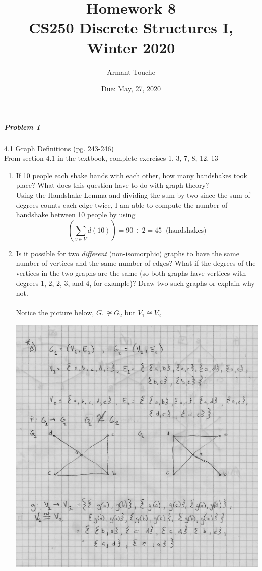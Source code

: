 \documentclass[11pt,a4paper]{article}
\title{\bf Homework 8\\[1ex]
\rm\normalsize CS250 Discrete Structures I, Winter 2020 }
\date{\normalsize Due: May, 27, 2020}
\author{\normalsize Armant Touche}
\newcommand\setItemNumber[1]{\setcounter{enumi}{\numexpr#1-1\relax}}
\begin{document}
 
\vspace{0cm}\maketitle 
	
	
	\subparagraph{Problem 1} 4.1 Graph Definitions (pg. 243-246) \\
			
		From section 4.1 in the textbook, complete exercises 1, 3, 7, 8, 12, 13

        \begin{enumerate}

        \item  If 10 people each shake hands with each other, how many handshakes took place? What does this question have to do with graph theory?\\
            Using the Handshake Lemma and dividing the sum by two since the sum of degrees counts each edge twice, I am able to compute the number of handshake between 10 people by using
            $$ (\sum_{v\in V} d(10)) = 90\div 2 = 45\;\;\text{(handshakes)}$$

        \setItemNumber{3}
    \item Is it possible for two \textit{different} (non-isomorphic) graphs to have the same number of vertices and the same number of edges? What if the degrees of the vertices in the two graphs are the same (so both graphs have vertices with degrees 1, 2, 2, 3, and 4, for example)? Draw two such graphs or explain why not.\\\\
        Notice the picture below, $G_1 \ncong G_2$ but $V_1\cong V_2$  

            \begin{center}
            \includegraphics[width=.60\textwidth]{hw8_graphic3}
            \end{center}


\end{enumerate}
\end{document}
